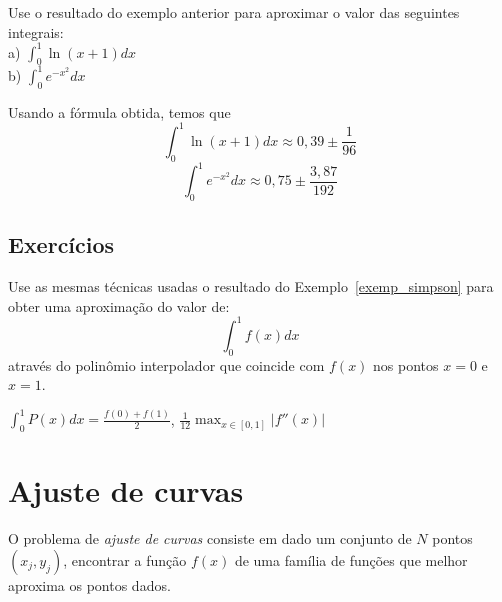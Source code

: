 \begin{ex}
Use o resultado do exemplo anterior para aproximar o valor das seguintes integrais:\\

a) $\displaystyle \int_0^1 \ln(x+1) dx$\\

b) $\displaystyle \int_0^1 e^{-x^2}dx$

\end{ex}
\begin{sol}
Usando a fórmula obtida, temos que
$$
\int_0^1\ln(x+1) dx \approx 0,39\pm \frac{1}{96}
$$
$$
\int_0^1 e^{-x^2} dx \approx 0,75\pm \frac{3,87}{192}
$$  
\end{sol}

\subsection*{Exercícios}

\begin{Exercise}
  Use as mesmas técnicas usadas o resultado do Exemplo~\ref{exemp_simpson} para obter uma aproximação do valor de:
  \begin{equation*}
    \int_0^1 f(x)dx
  \end{equation*}
através do polinômio interpolador que coincide com $f(x)$ nos pontos $x=0$ e $x=1$.
\end{Exercise}
\begin{Answer}
  \begin{tiny}
  $\int_0^1 P(x)dx =\frac{f(0)+f(1)}{2}$, $\frac{1}{12}\max_{x\in[0,1]}|f''(x)|$  
  \end{tiny}
\end{Answer}



\section{Ajuste de curvas}\label{sec:ajuste_de_curvas}

\begin{defn}
O problema de \emph{ajuste de curvas} consiste em dado um conjunto de $N$ pontos $(x_j,y_j)$, encontrar a função $f(x)$ de uma família de funções que melhor aproxima os pontos dados.
\end{defn}

